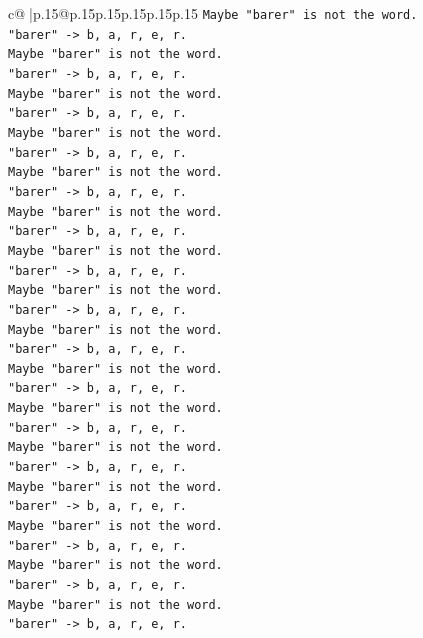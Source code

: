\documentclass{article}
\begin{document}
{\begin{supertabular}{c@{$\;$}|p{.15\linewidth}@{}p{.15\linewidth}p{.15\linewidth}p{.15\linewidth}p{.15\linewidth}p{.15\linewidth}}
{{{\texttt{Maybe "barer" is not the word.} \\
\texttt{"barer" {-}> b, a, r, e, r.} \\
\texttt{Maybe "barer" is not the word.} \\
\texttt{"barer" {-}> b, a, r, e, r.} \\
\texttt{Maybe "barer" is not the word.} \\
\texttt{"barer" {-}> b, a, r, e, r.} \\
\texttt{Maybe "barer" is not the word.} \\
\texttt{"barer" {-}> b, a, r, e, r.} \\
\texttt{Maybe "barer" is not the word.} \\
\texttt{"barer" {-}> b, a, r, e, r.} \\
\texttt{Maybe "barer" is not the word.} \\
\texttt{"barer" {-}> b, a, r, e, r.} \\
\texttt{Maybe "barer" is not the word.} \\
\texttt{"barer" {-}> b, a, r, e, r.} \\
\texttt{Maybe "barer" is not the word.} \\
\texttt{"barer" {-}> b, a, r, e, r.} \\
\texttt{Maybe "barer" is not the word.} \\
\texttt{"barer" {-}> b, a, r, e, r.} \\
\texttt{Maybe "barer" is not the word.} \\
\texttt{"barer" {-}> b, a, r, e, r.} \\
\texttt{Maybe "barer" is not the word.} \\
\texttt{"barer" {-}> b, a, r, e, r.} \\
\texttt{Maybe "barer" is not the word.} \\
\texttt{"barer" {-}> b, a, r, e, r.} \\
\texttt{Maybe "barer" is not the word.} \\
\texttt{"barer" {-}> b, a, r, e, r.} \\
\texttt{Maybe "barer" is not the word.} \\
\texttt{"barer" {-}> b, a, r, e, r.} \\
\texttt{Maybe "barer" is not the word.} \\
\texttt{"barer" {-}> b, a, r, e, r.} \\
\texttt{Maybe "barer" is not the word.} \\
\texttt{"barer" {-}> b, a, r, e, r.} \\
}}}
\end{supertabular}}
\end{document}
